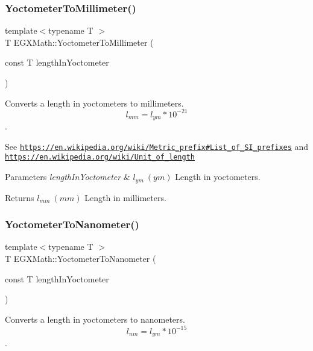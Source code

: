 \subsubsection{\texorpdfstring{Yoctometer\+To\+Millimeter()}{YoctometerToMillimeter()}}
{\footnotesize\ttfamily template$<$typename T $>$ \\
T E\+G\+X\+Math\+::\+Yoctometer\+To\+Millimeter (\begin{DoxyParamCaption}\item[{const T}]{length\+In\+Yoctometer }\end{DoxyParamCaption})}



Converts a length in yoctometers to millimeters. \[ l_{mm}=l_{ym} * 10^{-21} \]. 

See \href{https://en.wikipedia.org/wiki/Metric_prefix#List_of_SI_prefixes}{\tt https\+://en.\+wikipedia.\+org/wiki/\+Metric\+\_\+prefix\#\+List\+\_\+of\+\_\+\+S\+I\+\_\+prefixes} and \href{https://en.wikipedia.org/wiki/Unit_of_length}{\tt https\+://en.\+wikipedia.\+org/wiki/\+Unit\+\_\+of\+\_\+length} 
\begin{DoxyParams}{Parameters}
{\em length\+In\+Yoctometer} & $ l_{ym}\ (ym)$ Length in yoctometers. \\
\hline
\end{DoxyParams}
\begin{DoxyReturn}{Returns}
$ l_{mm}\ (mm)$ Length in millimeters. 
\end{DoxyReturn}
\mbox{\label{group___e_g_x_math-_conversions-_length_conversions-_yoctometer-_s_i_ga209906b099f04d26a1487bedcac4f65d}} 
\subsubsection{\texorpdfstring{Yoctometer\+To\+Nanometer()}{YoctometerToNanometer()}}
{\footnotesize\ttfamily template$<$typename T $>$ \\
T E\+G\+X\+Math\+::\+Yoctometer\+To\+Nanometer (\begin{DoxyParamCaption}\item[{const T}]{length\+In\+Yoctometer }\end{DoxyParamCaption})}



Converts a length in yoctometers to nanometers. \[ l_{nm}=l_{ym} * 10^{-15} \]. 

